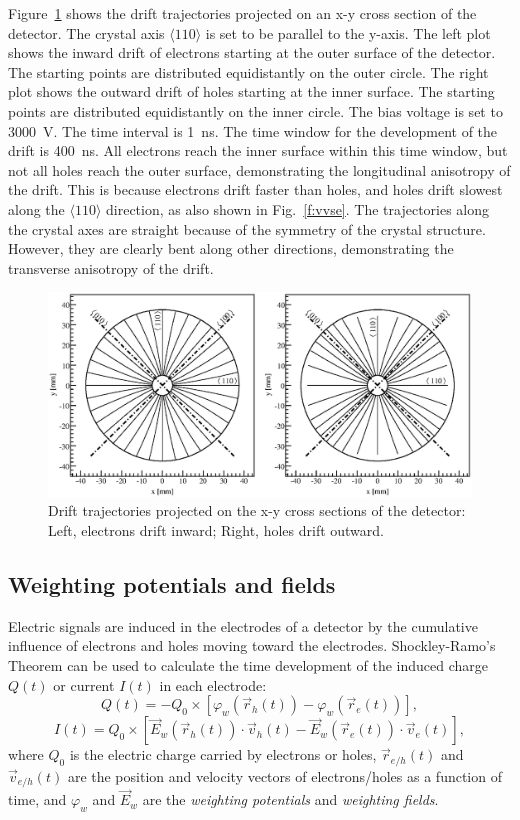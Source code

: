 \documentclass[epj,referee]{svjour}
\begin{document}
Figure~\ref{f:trjs} shows the drift trajectories projected on an x-y
cross section of the detector. The crystal axis $\langle 110 \rangle$
is set to be parallel to the y-axis. The left plot shows the inward
drift of electrons starting at the outer surface of the detector. The
starting points are distributed equidistantly on the outer circle.
The right plot shows the outward drift of holes starting at the inner
surface. The starting points are distributed equidistantly on the
inner circle. The bias voltage is set to 3000~V. The time interval is
1~ns. The time window for the development of the drift is 400~ns. All
electrons reach the inner surface within this time window, but not all
holes reach the outer surface, demonstrating the longitudinal
anisotropy of the drift. This is because electrons drift faster than
holes, and holes drift slowest along the $\langle 110 \rangle$
direction, as also shown in Fig.~\ref{f:vvse}. The trajectories along
the crystal axes are straight because of the symmetry of the crystal
structure. However, they are clearly bent along other directions,
demonstrating the transverse anisotropy of the drift.
\begin{figure}[tb]
\centering
\includegraphics[width=0.8\linewidth]{trjs} 
\caption{Drift trajectories projected on the x-y cross sections of the
detector: Left, electrons drift inward; Right, holes drift outward.}
\label{f:trjs} 
\end{figure} 
 
\subsection{Weighting potentials and fields}
\label{s:wei}
Electric signals are induced in the electrodes of a detector by the
cumulative influence of electrons and holes moving toward the
electrodes. Shockley-Ramo's Theorem \cite{Gat82,Rad88,He00} can be
used to calculate the time development of the induced charge $Q(t)$ or
current $I(t)$ in each electrode:
\begin{equation} 
\label{e:ramoq}
Q(t) = -Q_{0} \times [\varphi_{w}(\vec{r}_{h}(t)) -
\varphi_{w}(\vec{r}_{e}(t))],
\end{equation}
\begin{equation} 
\label{e:ramoi}
I(t) = Q_{0} \times [\vec{E}_{w}(\vec{r}_{h}(t)) \cdot 
\vec{v}_{h}(t) - \vec{E}_{w}(\vec{r}_{e}(t)) \cdot 
\vec{v}_{e}(t)],
\end{equation}
where $Q_{0}$ is the electric charge carried by electrons or holes,
$\vec{r}_{e/h}(t)$ and $\vec{v}_{e/h}(t)$ are the position and
velocity vectors of electrons/holes as a function of time, and
$\varphi_{w}$ and $\vec{E}_{w}$ are the \emph{weighting potentials}
and \emph{weighting fields}.
\end{document}
